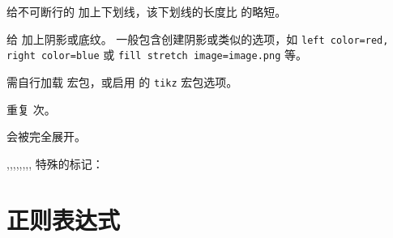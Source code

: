 \documentclass[class=article,openany]{cusdoc}
\begin{document}
\begin{function}{\@texhigh@underline}
  \begin{syntax}
    \V{\@texhigh@underline} 
  \end{syntax}
给不可断行的  加上下划线，该下划线的长度比  的略短。
\end{function}

\begin{function}{\@texhigh@shadetext}
  \begin{syntax}
    \V{\@texhigh@shadetext}  
  \end{syntax}
给  加上阴影或底纹。 一般包含创建阴影或类似的选项，如 \texttt{left color=red, right color=blue} 或 \texttt{fill stretch image=image.png} 等。

需自行加载  宏包，或启用  的 \texttt{tikz} 宏包选项。
\end{function}

\begin{function}[EXP]{\texhigh@replicate}
  \begin{syntax}
    \V{\texhigh@replicate}  
  \end{syntax}
重复   次。
\end{function}

\begin{function}{\texhigh@pdfliteral}
  \begin{syntax}
    \V{\texhigh@pdfliteral} 
  \end{syntax}
 会被完全展开。
\end{function}

\begin{function}{\THmB,\THmC,\THmD,\THmH,\THmN,\THmP,\THmR,\THmS,\THmT}
特殊的标记：
\end{function}

\section{正则表达式}\label{sec:regex}
\end{document}
